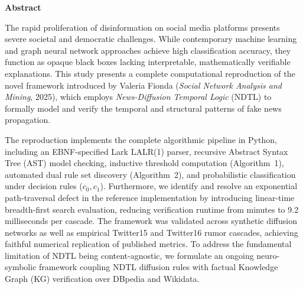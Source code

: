 \documentclass[10pt,twocolumn]{article}
\begin{document}

\noindent\textbf{\Large Abstract}

\vspace{0.5em}
\noindent
The rapid proliferation of disinformation on social media platforms presents severe societal and democratic challenges. While contemporary machine learning and graph neural network approaches achieve high classification accuracy, they function as opaque black boxes lacking interpretable, mathematically verifiable explanations. This study presents a complete computational reproduction of the novel framework introduced by Valeria Fionda (\textit{Social Network Analysis and Mining}, 2025), which employs \textit{News-Diffusion Temporal Logic} (NDTL) to formally model and verify the temporal and structural patterns of fake news propagation. 

The reproduction implements the complete algorithmic pipeline in Python, including an EBNF-specified Lark LALR(1) parser, recursive Abstract Syntax Tree (AST) model checking, inductive threshold computation (Algorithm~1), automated dual rule set discovery (Algorithm~2), and probabilistic classification under decision rules ($c_0, c_1$). Furthermore, we identify and resolve an exponential path-traversal defect in the reference implementation by introducing linear-time breadth-first search evaluation, reducing verification runtime from minutes to 9.2 milliseconds per cascade. The framework was validated across synthetic diffusion networks as well as empirical Twitter15 and Twitter16 rumor cascades, achieving faithful numerical replication of published metrics. To address the fundamental limitation of NDTL being content-agnostic, we formulate an ongoing neuro-symbolic framework coupling NDTL diffusion rules with factual Knowledge Graph (KG) verification over DBpedia and Wikidata.
\end{document}
